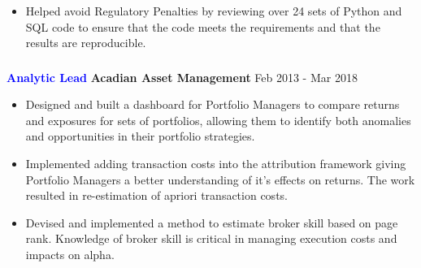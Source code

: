 \documentclass[10pt, letterpaper]{article} %
\providecommand{\tightlist}{%
  \setlength{\itemsep}{0pt}\setlength{\parskip}{0pt}}
\begin{document}
{{\begin{itemize}
\item Helped avoid Regulatory Penalties by reviewing over 24 sets of Python and SQL code to ensure that the code meets the requirements and that the results are reproducible. 

\end{itemize}


\vspace{-16pt}
\hypertarget{acadian}{\subsubsection{}\label{acadian}}
\textbf {\textcolor{blue}{Analytic Lead}} \hfill 
 \textbf{Acadian Asset Management} \hfill 
Feb 2013 -  Mar 2018

\begin{itemize}
\tightlist
\item
 Designed and built a dashboard for Portfolio Managers to compare returns and exposures for sets of portfolios, 
 allowing them to identify both anomalies and opportunities in their portfolio strategies.
\item
Implemented adding transaction costs
into the attribution framework giving Portfolio Managers
a better understanding of it's effects on returns. The work resulted in re-estimation of apriori transaction costs.
\item 
  Devised and implemented a method to estimate broker skill based on page rank.
  Knowledge of broker skill is critical in managing execution costs and impacts on alpha.
\end{itemize}

}}
\end{document}
